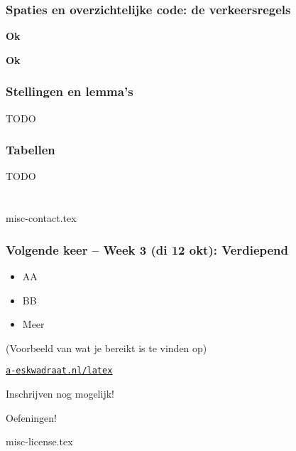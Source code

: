 \documentclass{cursuspresentatie}
\def\importslide#1#2{%
	{#2}
}
\begin{document}
\begin{frame}
	\frametitle{Spaties en overzichtelijke code: de verkeersregels}

	\textbf{\textcolor{darkpastelgreen}{Ok}}
	\medskip

	\textbf{\textcolor{darkpastelgreen}{Ok}}
\end{frame}


\begin{frame}
	\frametitle{Stellingen en lemma's}

	TODO
\end{frame}

\begin{frame}
	\frametitle{Tabellen}

	TODO
\end{frame}

\section{\texorpdfstring{}{Misc}}

\importslide{misc}{misc-contact.tex}

\begin{frame}
	\frametitle{Volgende keer -- Week 3 (di 12 okt): Verdiepend}

	\begin{multicols}{2}
		\begin{itemize}
			\item AA
			\item BB
			\item Meer
		\end{itemize}\par
		\vfill
		\leavevmode
	\end{multicols}

	(Voorbeeld van wat je bereikt is te vinden op)
	\begin{center}
		\href{https://a-eskwadraat.nl/latex}{\ul{\texttt{a-eskwadraat.nl/latex}}}
	\end{center}

	\medskip
	Inschrijven nog mogelijk!
\end{frame}

\begin{frame}
	Oefeningen!
\end{frame}

\ifishandout
	\importslide{misc}{misc-license.tex}
\fi
	
\end{document}
